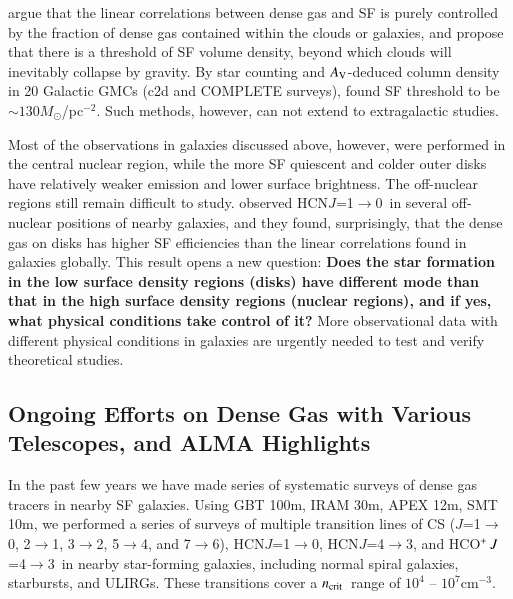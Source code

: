 \documentclass[legal,11pt]{article}
\def\cmt   {cm$^{-3}$\,}
\def\,{\thinspace}
\def\Msun{$M_\odot$}
\def\to{$\rightarrow$}
\def\Lcs    {$L'_{\rm CS}$}
\def\ncrit{$n_{\rm crit}$}
\def\LIR     {$L_{\rm IR}$}
\def\HCNoz      {HCN\,$J$=1$\rightarrow$0}
\def\HCNft        {HCN\,$J$=4$\rightarrow$3}
\def\HCOPft     {HCO$^+\,J$=4$\rightarrow$3}
\begin{document}
\citet{Lada12} argue that the linear correlations between dense gas and SF is
purely controlled by the fraction of dense gas contained within the clouds or
galaxies, and propose that there is a threshold of SF volume density, beyond
which clouds will inevitably collapse by gravity. By star counting and $A_{\rm
V}$-deduced column density in 20 Galactic GMCs (c2d and COMPLETE surveys),
\citet{Heiderman2010} found SF threshold to be $\sim 130$\Msun/pc$^{-2}$.  Such
methods, however, can not extend to extragalactic studies. 


Most of the observations in galaxies discussed above, however, were performed
in  the central nuclear region, while the more SF quiescent and colder outer
disks have relatively weaker emission and lower surface brightness. The
off-nuclear regions still remain difficult to study. \citet{usero15} observed
\HCNoz\ in several off-nuclear positions of nearby galaxies, and they found,
surprisingly, that the dense gas on disks has higher SF efficiencies than the
linear correlations found in galaxies globally. This result opens a new
question: {\bf Does the star formation in the low surface density regions
(disks) have different mode than that in the high surface density regions
(nuclear regions), and if yes, what physical conditions take control of it?}
More observational data with different physical conditions in galaxies are
urgently needed to test and verify theoretical studies. 


\subsection{Ongoing Efforts on Dense Gas with Various Telescopes, and ALMA
Highlights} 


In the past few years we have made series of systematic surveys of dense gas
tracers in nearby SF galaxies. Using GBT 100m, IRAM 30m, APEX 12m, SMT 10m, we
performed a series of surveys of multiple transition lines of CS ($J$=1\to0,
2\to1, 3\to2, 5\to4, and 7\to6), \HCNoz, \HCNft, and \HCOPft\ in nearby
star-forming galaxies, including normal spiral galaxies, starbursts, and ULIRGs.
These transitions cover a \ncrit\ range of  $10^4$ -- $10^7$\cmt. 

\end{document}
